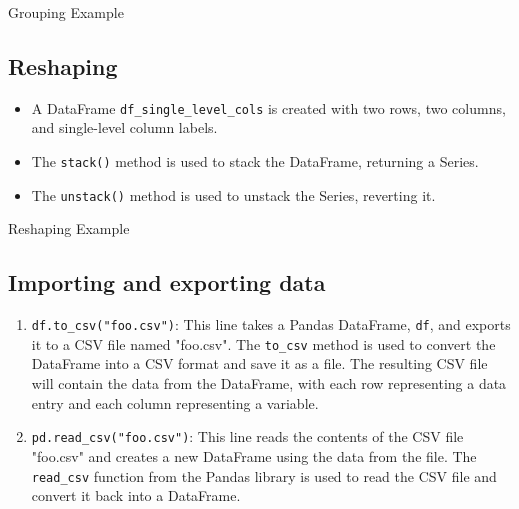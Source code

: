 	\begin{code}[h!]
	    
	
	\caption{Grouping Example}
	
	\end{code}

	\subsection{Reshaping}
	
	\begin{itemize}
		
		\item A DataFrame \texttt{df\_single\_level\_cols} is created with two rows, two columns, and single-level column labels.
		
		\item The \texttt{stack()} method is used to stack the DataFrame, returning a Series.
		
		\item The \texttt{unstack()} method is used to unstack the Series, reverting it.
		
	\end{itemize}

	\begin{code}[h!]
	    
	
	\caption{Reshaping Example}
	
	\end{code}

	\subsection{Importing and exporting data}
	
	\begin{enumerate}
		\item \texttt{df.to\_csv("foo.csv")}: This line takes a Pandas DataFrame, \texttt{df}, and exports it to a CSV file named "foo.csv". The \texttt{to\_csv} method is used to convert the DataFrame into a CSV format and save it as a file. The resulting CSV file will contain the data from the DataFrame, with each row representing a data entry and each column representing a variable.
		
		\item \texttt{pd.read\_csv("foo.csv")}: This line reads the contents of the CSV file "foo.csv" and creates a new DataFrame using the data from the file. The \texttt{read\_csv} function from the Pandas library is used to read the CSV file and convert it back into a DataFrame.
	\end{enumerate}
	
